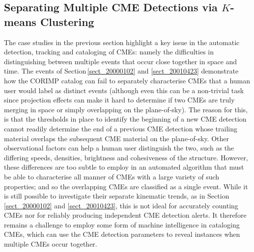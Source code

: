 \documentclass[referee,a4paper,12pt,traditabstract]{swsc}
\begin{document}
\begin{linenumbers}
\section{Separating Multiple CME Detections via $K$-means Clustering}
\label{sect_clusters}


The case studies in the previous section highlight a key issue in the automatic detection, tracking and cataloging of CMEs: namely the difficulties in distinguishing between multiple events that occur close together in space and time. The events of Section\,\ref{sect_20000102} and \ref{sect_20010423} demonstrate how the CORIMP catalog can fail to separately characterise CMEs that a human user would label as distinct events (although even this can be a non-trivial task since projection effects can make it hard to determine if two CMEs are truly merging in space or simply overlapping on the plane-of-sky). The reason for this, is that the thresholds in place to identify the beginning of a new CME detection cannot readily determine the end of a previous CME detection whose trailing material overlaps the subsequent CME material on the plane-of-sky. Other observational factors can help a human user distinguish the two, such as the differing speeds, densities, brightness and cohesiveness of the structure. However, these differences are too subtle to employ in an automated algorithm that must be able to characterise all manner of CMEs with a large variety of such properties; and so the overlapping CMEs are classified as a single event. While it is still possible to investigate their separate kinematic trends, as in Section\,\ref{sect_20000102} and \ref{sect_20010423}, this is not ideal for accurately counting CMEs nor for reliably producing independent CME detection alerts. It therefore remains a challenge to employ some form of machine intelligence in cataloging CMEs, which can use the CME detection parameters to reveal instances when multiple CMEs occur together.



\end{linenumbers}
\end{document}
